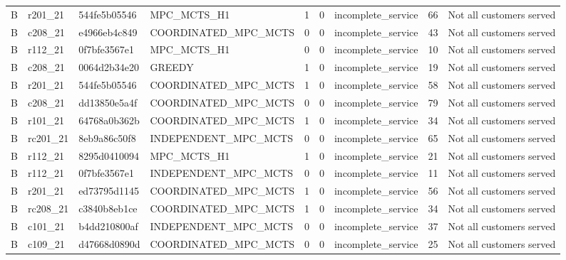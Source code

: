 \begin{table}
{\begin{tabular}{llllrrlrl}
B & r201\_21 & 544fe5b05546 & MPC\_MCTS\_H1 & 1 & 0 & incomplete\_service & 66 & Not all customers served \\
B & c208\_21 & e4966eb4c849 & COORDINATED\_MPC\_MCTS & 0 & 0 & incomplete\_service & 43 & Not all customers served \\
B & r112\_21 & 0f7bfe3567e1 & MPC\_MCTS\_H1 & 0 & 0 & incomplete\_service & 10 & Not all customers served \\
B & c208\_21 & 0064d2b34e20 & GREEDY & 1 & 0 & incomplete\_service & 19 & Not all customers served \\
B & r201\_21 & 544fe5b05546 & COORDINATED\_MPC\_MCTS & 1 & 0 & incomplete\_service & 58 & Not all customers served \\
B & c208\_21 & dd13850e5a4f & COORDINATED\_MPC\_MCTS & 0 & 0 & incomplete\_service & 79 & Not all customers served \\
B & r101\_21 & 64768a0b362b & COORDINATED\_MPC\_MCTS & 1 & 0 & incomplete\_service & 34 & Not all customers served \\
B & rc201\_21 & 8eb9a86c50f8 & INDEPENDENT\_MPC\_MCTS & 0 & 0 & incomplete\_service & 65 & Not all customers served \\
B & r112\_21 & 8295d0410094 & MPC\_MCTS\_H1 & 1 & 0 & incomplete\_service & 21 & Not all customers served \\
B & r112\_21 & 0f7bfe3567e1 & INDEPENDENT\_MPC\_MCTS & 0 & 0 & incomplete\_service & 11 & Not all customers served \\
B & r201\_21 & ed73795d1145 & COORDINATED\_MPC\_MCTS & 1 & 0 & incomplete\_service & 56 & Not all customers served \\
B & rc208\_21 & c3840b8eb1ce & COORDINATED\_MPC\_MCTS & 1 & 0 & incomplete\_service & 34 & Not all customers served \\
B & c101\_21 & b4dd210800af & INDEPENDENT\_MPC\_MCTS & 0 & 0 & incomplete\_service & 37 & Not all customers served \\
B & c109\_21 & d47668d0890d & COORDINATED\_MPC\_MCTS & 0 & 0 & incomplete\_service & 25 & Not all customers served \\
\bottomrule
\end{tabular}
}
\end{table}
